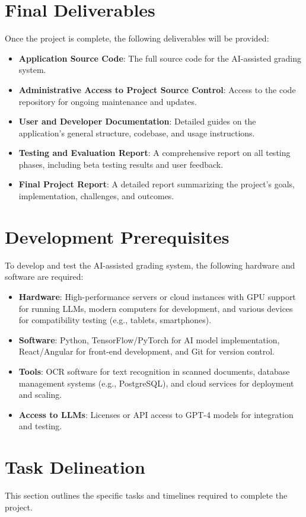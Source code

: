 \documentclass[ms,twoside,print]{nuthesis}
\begin{document}
\section{Final Deliverables}
Once the project is complete, the following deliverables will be provided:
\begin{itemize}
    \item \textbf{Application Source Code}: The full source code for the AI-assisted grading system.
    \item \textbf{Administrative Access to Project Source Control}: Access to the code repository for ongoing maintenance and updates.
    \item \textbf{User and Developer Documentation}: Detailed guides on the application's general structure, codebase, and usage instructions.
    \item \textbf{Testing and Evaluation Report}: A comprehensive report on all testing phases, including beta testing results and user feedback.
    \item \textbf{Final Project Report}: A detailed report summarizing the project's goals, implementation, challenges, and outcomes.
\end{itemize}

\section{Development Prerequisites}
To develop and test the AI-assisted grading system, the following hardware and software are required:
\begin{itemize}
    \item \textbf{Hardware}: High-performance servers or cloud instances with GPU support for running LLMs, modern computers for development, and various devices for compatibility testing (e.g., tablets, smartphones).
    \item \textbf{Software}: Python, TensorFlow/PyTorch for AI model implementation, React/Angular for front-end development, and Git for version control.
    \item \textbf{Tools}: OCR software for text recognition in scanned documents, database management systems (e.g., PostgreSQL), and cloud services for deployment and scaling.
    \item \textbf{Access to LLMs}: Licenses or API access to GPT-4 models for integration and testing.
\end{itemize}

\section{Task Delineation}
This section outlines the specific tasks and timelines required to complete the project.
\end{document}
